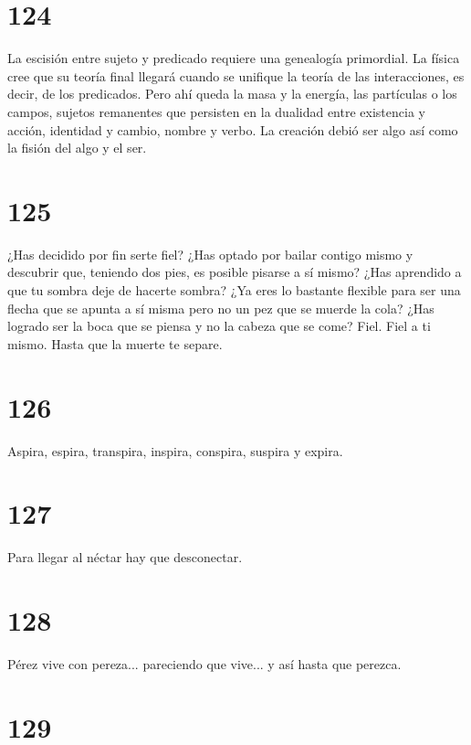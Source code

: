 \documentclass[a4paper,11pt,openright,twocolumn]{book}
\begin{document}
\section*{124}

La escisión entre sujeto y predicado requiere una genealogía primordial. La física cree que su teoría
final llegará cuando se unifique la teoría de las interacciones, es decir, de los predicados. Pero ahí
queda la masa y la energía, las partículas o los campos, sujetos remanentes que persisten en la
dualidad entre existencia y acción, identidad y cambio, nombre y verbo. La creación debió ser algo así como
la fisión del algo y el ser.

\section*{125}

¿Has decidido por fin serte fiel? ¿Has optado por bailar contigo mismo y descubrir que, teniendo
dos pies, es posible pisarse a sí mismo? ¿Has aprendido a que tu sombra deje de hacerte sombra?
¿Ya eres lo bastante flexible para ser una flecha que se apunta a sí misma pero no un pez que
se muerde la cola? ¿Has logrado ser la boca que se piensa y no la cabeza que se come? Fiel. Fiel
a ti mismo. Hasta que la muerte te separe.

\section*{126}

Aspira, espira, transpira, inspira, conspira, suspira y expira.


\section*{127}

Para llegar al néctar hay que desconectar.

\section*{128}

Pérez vive con pereza... pareciendo que vive... y así hasta que perezca.


\section*{129}
\end{document}
